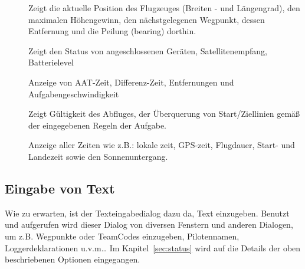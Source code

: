 \begin{description}
\item[]Zeigt die aktuelle Position des Flugzeuges (Breiten - und Längengrad), den maximalen Höhengewinn, den nächstgelegenen Wegpunkt, dessen Entfernung  und die Peilung (bearing) dorthin.

\item[] Zeigt den Status von angeschlossenen Geräten, Satellitenempfang,  Batterielevel

\item[] Anzeige von AAT-Zeit, Differenz-Zeit, Entfernungen und Aufgabengeschwindigkeit

\item[] Zeigt Gültigkeit des Abfluges, der Überquerung von Start/Ziellinien gemäß der eingegebenen Regeln der Aufgabe.

\item[] Anzeige aller Zeiten wie z.B.: lokale zeit, GPS-zeit, Flugdauer, Start-  und Landezeit sowie den Sonnenuntergang.
\end{description}

\subsection*{Eingabe von Text} \label{sec:textentry}

Wie zu erwarten, ist der Texteingabedialog dazu da, Text einzugeben.
Benutzt und aufgerufen wird dieser Dialog von diversen Fenstern und anderen Dialogen, um z.B. Wegpunkte oder TeamCodes  einzugeben, Pilotennamen, Loggerdeklarationen u.v.m\dots
Im Kapitel~\ref{sec:status} wird auf die Details der oben beschriebenen Optionen eingegangen.

